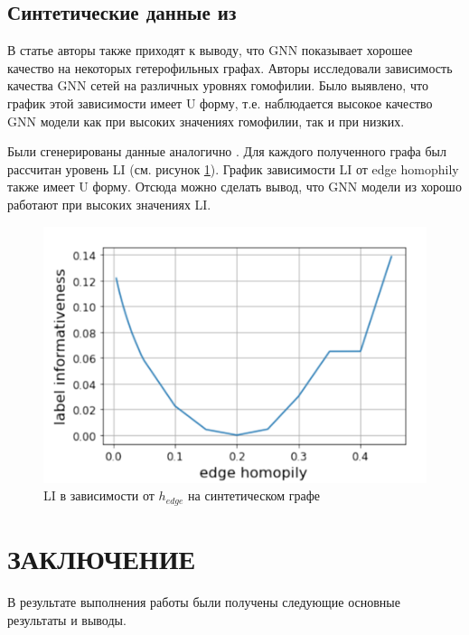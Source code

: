 \documentclass[a4paper,14pt]{article}
\begin{document}
	
	\subsection{Синтетические данные из \cite{luan2021heterophily}}
	
	В  статье \cite{luan2021heterophily} авторы также приходят к выводу, что GNN показывает хорошее качество на некоторых гетерофильных графах.
	Авторы исследовали зависимость качества GNN сетей на различных уровнях гомофилии.
	Было выявлено, что график этой зависимости имеет U форму, т.е. наблюдается высокое качество GNN модели как при высоких значениях гомофилии, так и при низких.
	
	Были сгенерированы данные аналогично \cite{luan2021heterophily}. Для каждого полученного графа был рассчитан уровень LI (см. рисунок \ref{fig:label-informativeness-depending-on-edge-homophily}).
	График зависимости LI от edge homophily также имеет U форму.
	Отсюда можно сделать вывод, что GNN модели из \cite{luan2021heterophily} хорошо работают при высоких значениях LI.
	
	\begin{figure}[H]
		\centering
		\includegraphics[width=0.4\linewidth]{"images/Label informativeness depending on edge homophily"}
		\caption{LI в зависимости от $h_{edge}$ на синтетическом графе \cite{luan2021heterophily}}
		\label{fig:label-informativeness-depending-on-edge-homophily}
	\end{figure}
	
	
	\pagebreak
	
	\section*{ \hfill ЗАКЛЮЧЕНИЕ \hfill}
	
	В результате выполнения работы были получены следующие основные результаты и выводы.
	
	
	
    \pagebreak
    \renewcommand{\refname}{{ \hfill СПИСОК ИСПОЛЬЗОВАННЫХ ИСТОЧНИКОВ \hfill}}
%    
    
    
    \newpage
\end{document}
